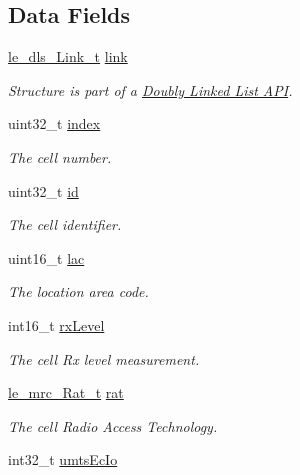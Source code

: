\subsection*{Data Fields}
\begin{DoxyCompactItemize}
\item 
\hyperlink{structle__dls___link__t}{le\+\_\+dls\+\_\+\+Link\+\_\+t} \hyperlink{structpa__mrc___cell_info__t_a5db4402db950ddff1170d5786a304e72}{link}
\begin{DoxyCompactList}\small\item\em Structure is part of a \hyperlink{c_doublyLinkedList}{Doubly Linked List A\+PI}. \end{DoxyCompactList}\item 
uint32\+\_\+t \hyperlink{structpa__mrc___cell_info__t_ad5be783113c7b4f8f90582279c5a6dfb}{index}
\begin{DoxyCompactList}\small\item\em The cell number. \end{DoxyCompactList}\item 
uint32\+\_\+t \hyperlink{structpa__mrc___cell_info__t_a59745bebda0ea8d569f5bf634c9f446a}{id}
\begin{DoxyCompactList}\small\item\em The cell identifier. \end{DoxyCompactList}\item 
uint16\+\_\+t \hyperlink{structpa__mrc___cell_info__t_a5b56d1b1a885b474a024a978fc2a3cbf}{lac}
\begin{DoxyCompactList}\small\item\em The location area code. \end{DoxyCompactList}\item 
int16\+\_\+t \hyperlink{structpa__mrc___cell_info__t_a126363d808190c8f784ec7ae87940745}{rx\+Level}
\begin{DoxyCompactList}\small\item\em The cell Rx level measurement. \end{DoxyCompactList}\item 
\hyperlink{le__mrc__interface_8h_aaf23906c37ad59fb96a8a48f7fab5b43}{le\+\_\+mrc\+\_\+\+Rat\+\_\+t} \hyperlink{structpa__mrc___cell_info__t_ad3f31121640ff91d1fed94c9ef140549}{rat}
\begin{DoxyCompactList}\small\item\em The cell Radio Access Technology. \end{DoxyCompactList}\item 
int32\+\_\+t \hyperlink{structpa__mrc___cell_info__t_a31d5e4e6ee7c60466c08c01dfb485095}{umts\+Ec\+Io}

\end{DoxyCompactItemize}

